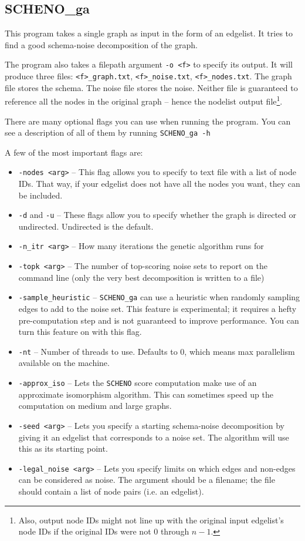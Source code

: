 \documentclass{article}
\begin{document}
\subsection{SCHENO\_ga}

This program takes a single graph as input in the form of an edgelist. It tries to find a good schema-noise decomposition of the graph.

The program also takes a filepath argument \verb|-o <f>| to specify its output. It will produce three files: \verb|<f>_graph.txt|, \verb|<f>_noise.txt|, \verb|<f>_nodes.txt|. The graph file stores the schema. The noise file stores the noise. Neither file is guaranteed to reference all the nodes in the original graph -- hence the nodelist output file\footnote{Also, output node IDs might not line up with the original input edgelist's node IDs if the original IDs were not 0 through $n - 1$.}.

There are many optional flags you can use when running the program. You can see a description of all of them by running \verb|SCHENO_ga -h|

A few of the most important flags are:

\begin{itemize}
    \item \verb|-nodes <arg>| -- This flag allows you to specify to text file with a list of node IDs. That way, if your edgelist does not have all the nodes you want, they can be included.
    \item \verb|-d| and \verb|-u| -- These flags allow you to specify whether the graph is directed or undirected. Undirected is the default.
    \item \verb|-n_itr <arg>| -- How many iterations the genetic algorithm runs for
    \item \verb|-topk <arg>| -- The number of top-scoring noise sets to report on the command line (only the very best decomposition is written to a file)
    \item \verb|-sample_heuristic| -- \verb|SCHENO_ga| can use a heuristic when randomly sampling edges to add to the noise set. This feature is experimental; it requires a hefty pre-computation step and is not guaranteed to improve performance. You can turn this feature on with this flag.
    \item \verb|-nt| -- Number of threads to use. Defaults to 0, which means max parallelism available on the machine.
    \item \verb|-approx_iso| -- Lets the \verb|SCHENO| score computation make use of an approximate isomorphism algorithm. This can sometimes speed up the computation on medium and large graphs.
    \item \verb|-seed <arg>| -- Lets you specify a starting schema-noise decomposition by giving it an edgelist that corresponds to a noise set. The algorithm will use this as its starting point.
    \item \verb|-legal_noise <arg>| -- Lets you specify limits on which edges and non-edges can be considered as noise. The argument should be a filename; the file should contain a list of node pairs (i.e. an edgelist).
\end{itemize}
\end{document}
